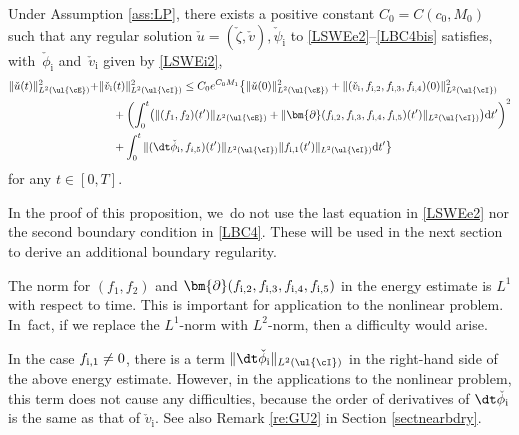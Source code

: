 \begin{proposition}\label{prop:BEE}
Under Assumption \ref{ass:LP}, there exists a positive constant $C_0=C(c_0,M_0)$ such that any regular solution
$\check{u}=(\check{\zeta},\check{v}), \check{\psi}_\mathrm{i}$ to \eqref{LSWEe2}--\eqref{LBC4bis} satisfies,
with~$\check{\phi}_\mathrm{i}$ and~$\check{v}_\mathrm{i}$ given by \eqref{LSWEi2},
\begin{align*}
\|\check{u}(t)\|_{L^2(\ul{\cE})}^2 +& \|\check{v}_\mathrm{i}(t)\|_{L^2(\ul{\cI})}^2
\leq C_0 e^{C_0M_1}\bigl\{ \|\check{u}(0)\|_{L^2(\ul{\cE})}^2 + \|(\check{v}_\mathrm{i},f_{{\rm i},2},f_{{\rm i},3},f_{{\rm i},4})(0)\|_{L^2(\ul{\cI})}^2 \\
&\quad\;
+ \left(\int_0^t \bigl(\|(f_1,f_2)(t')\|_{L^2(\ul{\cE})}
+ \|\bm{\partial}(f_{{\rm i},2},f_{{\rm i},3},f_{{\rm i},4},f_{{\rm i},5})(t')\|_{L^2(\ul{\cI})} \bigr){\rm d}t' \right)^2\\
&\quad\;
+ \int_0^t\|(\dt\check{\phi}_\mathrm{i},f_{i,5})(t')\|_{L^2(\ul{\cI})}\|f_{{\rm i},1}(t')\|_{L^2(\ul{\cI})}{\rm d}t' \bigr\}
\end{align*}
for any $t\in[0,T]$.
\end{proposition}

\skpt
\begin{remark}
\begin{enumeratei}
\item
In the proof of this proposition, we~do not use the last equation in \eqref{LSWEe2} nor the second boundary condition in \eqref{LBC4}.
These will be used in the next section to derive an additional boundary regularity.

\item
The norm for $(f_1,f_2)$ and $\bm{\partial}(f_{{\rm i},2},f_{{\rm i},3},f_{{\rm i},4},f_{{\rm i},5})$ in the energy estimate is $L^1$ with respect to time.
This is important for application to the nonlinear problem. In~fact, if we replace the $L^1$-norm with $L^2$-norm, then a difficulty would arise.

\item
In the case $f_{{\rm i},1}\ne0$, there is a term $\|\dt\check{\phi}_\mathrm{i}\|_{L^2(\ul{\cI})}$ in the right-hand side of the above energy estimate.
However, in the applications to the nonlinear problem, this term does not cause any difficulties,
because the order of derivatives of $\dt\check{\phi}_\mathrm{i}$ is the same as that of $\check{v}_\mathrm{i}$.
See also Remark \ref{re:GU2} in Section \ref{sectnearbdry}.
\end{enumeratei}
\end{remark}

